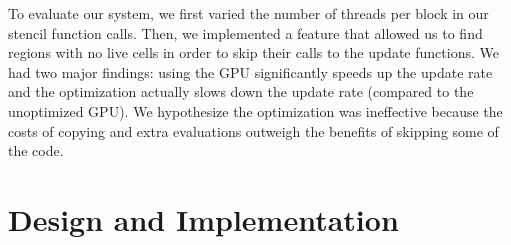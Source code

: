 \documentclass[onecolumn,12pt]{IEEEtran}
\begin{document}
  To evaluate our system, we first varied the number of threads per block in our
  stencil function calls. Then, we implemented a feature that allowed us to find
  regions with no live cells in order to skip their calls to the update
  functions.  We had two major findings: using the GPU significantly speeds up
  the update rate and the optimization actually slows down the update rate
  (compared to the unoptimized GPU). We hypothesize the optimization was
  ineffective because the costs of copying and extra evaluations outweigh the
  benefits of skipping some of the code.

  \section{Design and Implementation}
\end{document}
